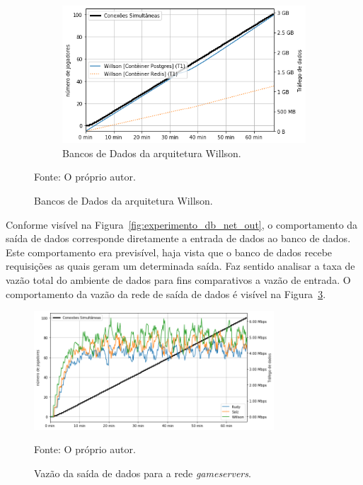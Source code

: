 \begin{figure}[htb!]
    \begin{subfigure}{0.5\textwidth}
        \centering
        \includegraphics[width=.95\linewidth]{figuras/analise/rt/w_net_out_db.png}
        \caption{Bancos de Dados da arquitetura Willson.}
        \label{fig:w_netout_db}
    \end{subfigure}

    Fonte: O próprio autor.
\end{figure}

Conforme visível na Figura~\ref{fig:experimento_db_net_out}, o comportamento da saída de dados corresponde diretamente a entrada de dados ao banco de dados.
%
Este comportamento era previsível, haja vista que o banco de dados recebe requisições as quais geram um determinada saída.
%
Faz sentido analisar a taxa de vazão total do ambiente de dados para fins comparativos a vazão de entrada.
%
O comportamento da vazão da rede de saída de dados é visível na Figura~\ref{fig:net_out_db}.

\begin{figure}[htb!]
  \caption{Vazão da saída de dados para a rede \textit{gameservers}.}
  \label{fig:net_out_db}
  \includegraphics[width=0.8\textwidth]{figuras/analise/net_out_db.png}
  \centering

  Fonte: O próprio autor.
\end{figure}

